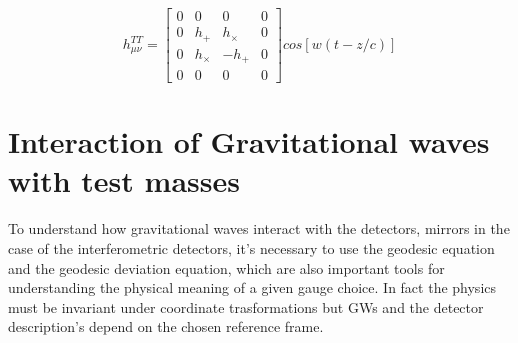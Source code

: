 \documentclass[binding=0.6cm, LaM]{sapthesis}
\begin{document}
\begin{equation} 
h_{\mu\nu}^{TT} = 
\begin{bmatrix}
0 & 0 & 0 & 0 \\
0 & h_{+} & h_{\times} & 0 \\
0 & h_{\times} & -h_{+} & 0 \\
0 & 0 & 0 & 0 
\end{bmatrix}cos[w(t-z/c)]
\end{equation}




\chapter{Interaction of Gravitational waves with test masses}

To understand how gravitational waves interact with the detectors, mirrors in the case of the interferometric detectors, it's necessary to use the geodesic equation and 
the geodesic deviation equation, which are also important tools for understanding the physical meaning of a given gauge choice. 
In fact the physics must be invariant under coordinate trasformations but GWs and the detector description's depend on the chosen reference frame. 
\end{document}
